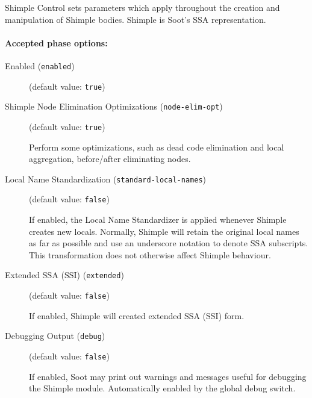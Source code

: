 \documentclass{article}
\begin{document}
\par

Shimple Control sets parameters which apply throughout the
creation and manipulation of Shimple bodies. Shimple is Soot's
SSA representation.


\paragraph{Accepted phase options:} 

\begin{description}

\item[Enabled ({\tt enabled})]
(default value: {\tt true})






\item[Shimple Node Elimination Optimizations ({\tt node-elim-opt})]
(default value: {\tt true})




          
\par

          Perform some optimizations, such as dead code elimination
          and local aggregation, before/after eliminating nodes.
         
         


\item[Local Name Standardization ({\tt standard-local-names})]
(default value: {\tt false})




            If enabled, the Local Name Standardizer is applied whenever
            Shimple creates new locals.  Normally, Shimple will retain
            the original local names as far as possible and use an
            underscore notation to denote SSA subscripts.  This
            transformation does not otherwise affect Shimple
            behaviour.
          


\item[Extended SSA (SSI) ({\tt extended})]
(default value: {\tt false})




            If enabled, Shimple will created extended SSA (SSI) form.
          


\item[Debugging Output ({\tt debug})]
(default value: {\tt false})




            If enabled, Soot may print out warnings and messages
            useful for debugging the Shimple module.  Automatically
            enabled by the global debug switch.
          


\end{description}
\end{document}
